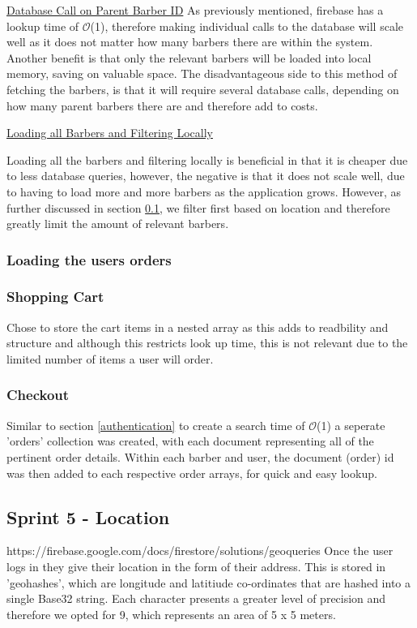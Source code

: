 \documentclass[12pt]{article}
\begin{document}
	\noindent
	\underline{Database Call on Parent Barber ID}
	\newline
	As previously mentioned, firebase has a lookup time of $\mathcal{O}$(1), therefore making individual calls to the database will scale well as it does not matter how many barbers there are within the system. Another benefit is that only the relevant barbers will be loaded into local memory, saving on valuable space. The disadvantageous side to this method of fetching the barbers, is that it will require several database calls, depending on how many parent barbers there are and therefore add to costs.
	\newline
	
	\noindent	
	\underline{Loading all Barbers and Filtering Locally}
	\newline
	
	Loading all the barbers and filtering locally is beneficial in that it is cheaper due to less database queries, however, the negative is that it does not scale well, due to having to load more and more barbers as the application grows. However, as further discussed in section \ref{sprint-location}, we filter first based on location and therefore greatly limit the amount of relevant barbers.
	
	\subsubsection{Loading the users orders}
	
	
	
	\subsubsection{Shopping Cart}
	Chose to store the cart items in a nested array as this adds to readbility and structure and although this restricts look up time, this is not relevant due to the limited number of items a user will order.
	
	\subsubsection{Checkout}
	Similar to section \ref{authentication} to create a search time of $\mathcal{O}$(1) a seperate 'orders' collection was created, with each document representing all of the pertinent order details. Within each barber and user, the document (order) id was then added to each respective order arrays, for quick and easy lookup.
	
	\subsection{Sprint 5 - Location}
	\label{sprint-location}
	https://firebase.google.com/docs/firestore/solutions/geoqueries
	Once the user logs in they give their location in the form of their address. This is stored in 'geohashes', which are longitude and latitiude co-ordinates that are hashed into a single Base32 string. Each character presents a greater level of precision and therefore we opted for 9, which represents an area of 5 x 5 meters.
	
\end{document}
